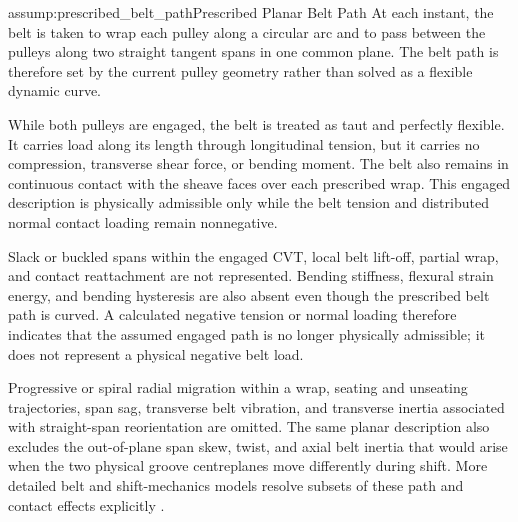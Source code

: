 \documentclass[11pt]{report}
\numberwithin{equation}{section}
\newcounter{assump}
\begin{document}
\begin{assumptionblock}{assump:prescribed_belt_path}{Prescribed Planar Belt Path}
At each instant, the belt is taken to wrap each pulley along a circular arc and
to pass between the pulleys along two straight tangent spans in one common
plane. The belt path is therefore set by the current pulley geometry rather
than solved as a flexible dynamic curve.

While both pulleys are engaged, the belt is treated as taut and perfectly
flexible. It carries load along its length through longitudinal tension, but it
carries no compression, transverse shear force, or bending moment. The belt
also remains in continuous contact with the sheave faces over each prescribed
wrap. This engaged description is physically admissible only while the belt
tension and distributed normal contact loading remain nonnegative.

\AssumptionConsequences
Slack or buckled spans within the engaged CVT, local belt lift-off, partial
wrap, and contact reattachment are not represented. Bending stiffness,
flexural strain energy, and bending hysteresis are also absent even though the
prescribed belt path is curved. A calculated negative tension or normal
loading therefore indicates that the assumed engaged path is no longer
physically admissible; it does not represent a physical negative belt load.

Progressive or spiral radial migration within a wrap, seating and unseating
trajectories, span sag, transverse belt vibration, and transverse inertia
associated with straight-span reorientation are omitted. The same planar
description also excludes the out-of-plane span skew, twist, and axial belt
inertia that would arise when the two physical groove centreplanes move
differently during shift. More detailed belt and shift-mechanics models
resolve subsets of these path and contact effects explicitly
\citep{Sorge2008,KongParker2005,Messick2018}.
\end{assumptionblock}
\end{document}

